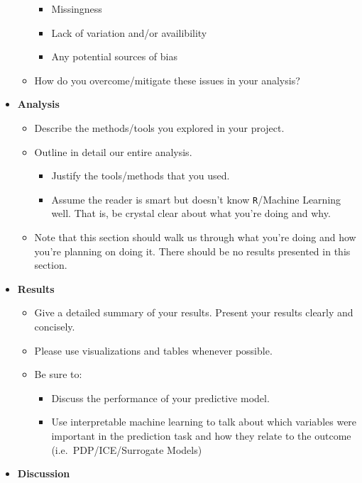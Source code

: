 \documentclass[
  12pt,
]{article}
\providecommand{\tightlist}{%
  \setlength{\itemsep}{0pt}\setlength{\parskip}{0pt}}
\begin{document}
\begin{itemize}
\begin{itemize}
    \begin{itemize}
    \tightlist
    \item
      Missingness
    \item
      Lack of variation and/or availibility
    \item
      Any potential sources of bias
    \end{itemize}
  \item
    How do you overcome/mitigate these issues in your analysis?
  \end{itemize}
\item
  \textbf{Analysis}

  \begin{itemize}
  \item
    Describe the methods/tools you explored in your project.
  \item
    Outline in detail our entire analysis.

    \begin{itemize}
    \tightlist
    \item
      Justify the tools/methods that you used.
    \item
      Assume the reader is smart but doesn't know \texttt{R}/Machine
      Learning well. That is, be crystal clear about what you're doing
      and why.
    \end{itemize}
  \item
    Note that this section should walk us through what you're doing and
    how you're planning on doing it. There should be no results
    presented in this section.
  \end{itemize}
\item
  \textbf{Results}

  \begin{itemize}
  \item
    Give a detailed summary of your results. Present your results
    clearly and concisely.
  \item
    Please use visualizations and tables whenever possible.
  \item
    Be sure to:

    \begin{itemize}
    \tightlist
    \item
      Discuss the performance of your predictive model.
    \item
      Use interpretable machine learning to talk about which variables
      were important in the prediction task and how they relate to the
      outcome (i.e.~PDP/ICE/Surrogate Models)
    \end{itemize}
  \end{itemize}
\item
  \textbf{Discussion}


\end{itemize}
\end{document}
